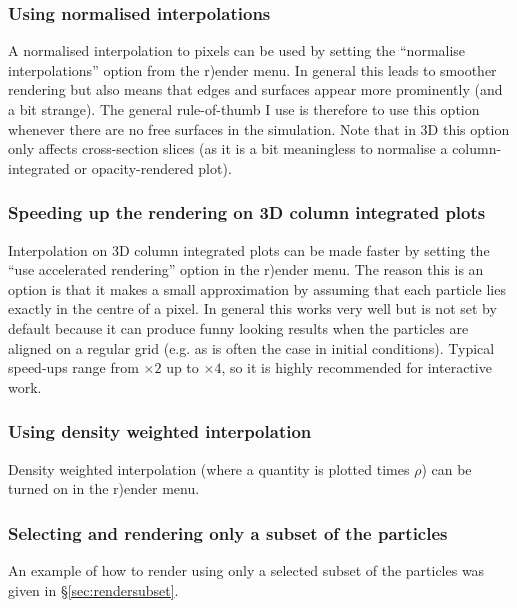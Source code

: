 \documentclass[a4paper,10pt]{article}
\begin{document}
\subsubsection{ Using normalised interpolations}
  A normalised interpolation to pixels can be used by setting the ``normalise interpolations'' option from the r)ender menu. In general this leads to smoother rendering but also means that edges and surfaces appear
more prominently (and a bit strange). The general rule-of-thumb I use is therefore to use this option whenever there are no free surfaces in the simulation. Note that in 3D this option only affects cross-section slices (as it is a bit meaningless to normalise a column-integrated or opacity-rendered plot). 

\subsubsection{ Speeding up the rendering on 3D column integrated plots}
 Interpolation on 3D column integrated plots can be made faster by setting the ``use accelerated rendering'' option in the r)ender menu. The reason this is an option is that it makes a small approximation by assuming that each particle lies exactly in the centre of a pixel.  In general this works very well but is not set by default because it can produce funny looking results when the particles are aligned on a regular grid (e.g. as is often the case in initial conditions). Typical speed-ups range from $\times 2$ up to $\times 4$, so it is highly recommended for interactive work.

\subsubsection{ Using density weighted interpolation}
 Density weighted interpolation (where a quantity is plotted times $\rho$) can be turned on in the r)ender menu.

\subsubsection{ Selecting and rendering only a subset of the particles}
 An example of how to render using only a selected subset of the particles was given in \S\ref{sec:rendersubset}.
\end{document}
